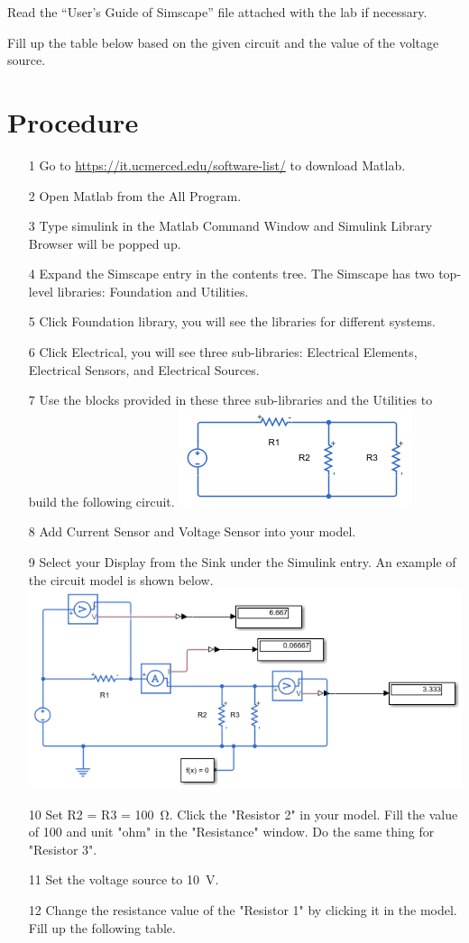 \documentclass[a4paper]{article}
\begin{document}
Read the “User’s Guide of Simscape” file attached with the lab if necessary.
  
Fill up the table below based on the given circuit and the value of the voltage source.

\section*{Procedure}
\begin{itemize}
	\item[1] Go to \href{https://it.ucmerced.edu/software-list/}{https://it.ucmerced.edu/software-list/} to download Matlab.
	\item[2] Open Matlab from the All Program.
	\item[3] Type simulink in the Matlab Command Window and Simulink Library Browser will be popped up.
	\item[4] Expand the Simscape entry in the contents tree. The Simscape has two top-level libraries: Foundation and Utilities.
	\item[5] Click Foundation library, you will see the libraries for different systems.
	\item[6] Click Electrical, you will see three sub-libraries: Electrical Elements, Electrical Sensors, and Electrical Sources.
	\item[7] Use the blocks provided in these three sub-libraries and the Utilities to build the following circuit.
	      \includegraphics{circuit.png}
	\item[8] Add Current Sensor and Voltage Sensor into your model.
	\item[9] Select your Display from the Sink under the Simulink entry. An example of the circuit model is shown below. \\
	      \includegraphics{circuit-final.png}
	\item[10] Set R2 = R3 = \SI{100}{\ohm}. Click the "Resistor 2" in your model. Fill the value of 100 and unit "ohm" in the "Resistance" window. Do the same thing for "Resistor 3".
	\item[11] Set the voltage source to \SI{10}{\volt}.
	\item[12] Change the resistance value of the "Resistor 1" by clicking it in the model. Fill up the following table.      
\end{itemize}
\end{document}
